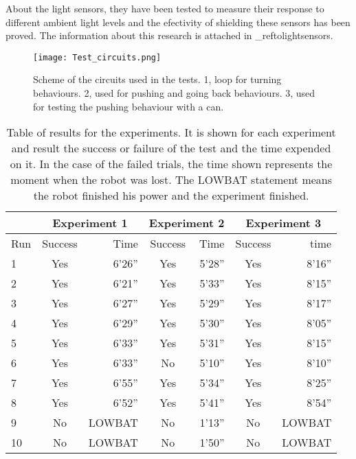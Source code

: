 About the light sensors, they have been tested to measure their response to different ambient light levels and the efectivity of shielding these sensors has been proved.
The information about this research is attached in \_reftolightsensors.


\begin{figure}[H]
\texttt{[image: Test\_circuits.png]}
\centering
\caption{Scheme of the circuits used in the tests. 1, loop for turning behaviours. 2, used for pushing and going back behaviours. 3, used for testing the pushing behaviour with a can. }
\label{fig:testMaps}
\end{figure}



\begin{table}[H]
	\center
	
	\begin{tabular}{|l|c|r|c|r|c|r|}
	  	\cline{2-7}
	  	\multicolumn{1}{r}{}
 		&  \multicolumn{2}{|c|}{Experiment 1}
 		& \multicolumn{2}{|c|}{Experiment 2} 
 		& \multicolumn{2}{|c|}{Experiment 3}  
		 \\ \cline{2-7}
		\hline
		Run & Success & Time & Success & Time & Success & time \\
		\hline
		1 	& Yes & 6'26'' & Yes & 5'28'' & Yes & 8'16''\\
		2 	& Yes & 6'21'' & Yes & 5'33'' & Yes & 8'15''\\
		3 	& Yes & 6'27'' & Yes & 5'29'' & Yes & 8'17''\\
		4 	& Yes & 6'29'' & Yes & 5'30'' & Yes & 8'05''\\
		5 	& Yes & 6'33'' & Yes & 5'31'' & Yes & 8'15''\\
		6 	& Yes & 6'33'' & No  & 5'10'' & Yes & 8'10''\\
		7 	& Yes & 6'55'' & Yes & 5'34'' & Yes & 8'25''\\
		8 	& Yes & 6'52'' & Yes & 5'41'' & Yes & 8'54''\\
		9 	& No & LOWBAT  & No  & 1'13'' & No 	& LOWBAT\\
		10 	& No & LOWBAT  & No  & 1'50'' & No 	& LOWBAT\\		
		\hline
	\end{tabular}

	\caption{Table of results for the experiments. It is shown for each experiment and result the success or failure of the test and the time expended on it. In the case of the failed trials, the time shown represents the moment when the robot was lost. The LOWBAT statement means the robot finished his power and the experiment finished.}
	\label{tab:Experiment1}
\end{table}



